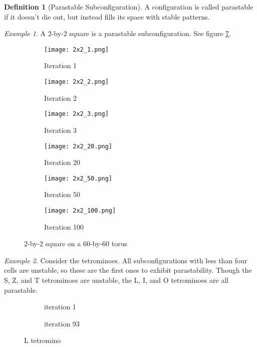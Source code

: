 \documentclass[12pt]{article}
\theoremstyle{definition}
\newtheorem{definition}{Definition}%
\theoremstyle{remark}
\theoremstyle{remark}
\newtheorem{example}{Example}%
\begin{document}
\begin{definition}[Parastable Subconfiguration]
A configuration is called parastable if it doesn't die out, but instead fills its space with stable patterns.
\end{definition}
\begin{example}
A 2-by-2 square is a parastable subconfiguration. See figure \ref{ParastableFig}.

\begin{figure}
  \centering
  \begin{subfigure}[b]{0.25\linewidth}
    \texttt{[image: 2x2\_1.png]}
    \caption{Iteration 1}
    \label{fig:2x2_1}
  \end{subfigure}
  \begin{subfigure}[b]{0.25\linewidth}
    \texttt{[image: 2x2\_2.png]}
    \caption{Iteration 2}
    \label{fig23x2_2}
  \end{subfigure}
  \begin{subfigure}[b]{0.25\linewidth}
    \texttt{[image: 2x2\_3.png]}
    \caption{Iteration 3}
    \label{fig:2x2_3}
  \end{subfigure}
  \begin{subfigure}[b]{0.25\linewidth}
    \texttt{[image: 2x2\_20.png]}
    \caption{Iteration 20}
    \label{fig:2x2_20}
  \end{subfigure}
  \begin{subfigure}[b]{0.25\linewidth}
    \texttt{[image: 2x2\_50.png]}
    \caption{Iteration 50}
    \label{fig:2x2_50}
  \end{subfigure}
  \begin{subfigure}[b]{0.25\linewidth}
    \texttt{[image: 2x2\_100.png]}
    \caption{Iteration 100}
    \label{fig:2x2_100}
  \end{subfigure}
  \caption{2-by-2 square on a 60-by-60 torus}
  \label{ParastableFig}
\end{figure} 

\end{example}
\begin{example}
Consider the tetrominoes. All subconfigurations with less than four cells are unstable, so these are the first ones to exhibit parastability. Though the S, Z, and T tetrominoes are unstable, the L, I, and O tetrominoes are all parastable. %
\begin{figure}
  \centering
  \begin{subfigure}[b]{0.4\linewidth}
    \caption{iteration 1}
  \end{subfigure}
  \begin{subfigure}[b]{0.4\linewidth}
    \caption{iteration 93}
  \end{subfigure}
  \caption{L tetromino}
\end{figure}
\end{example}
\end{document}
